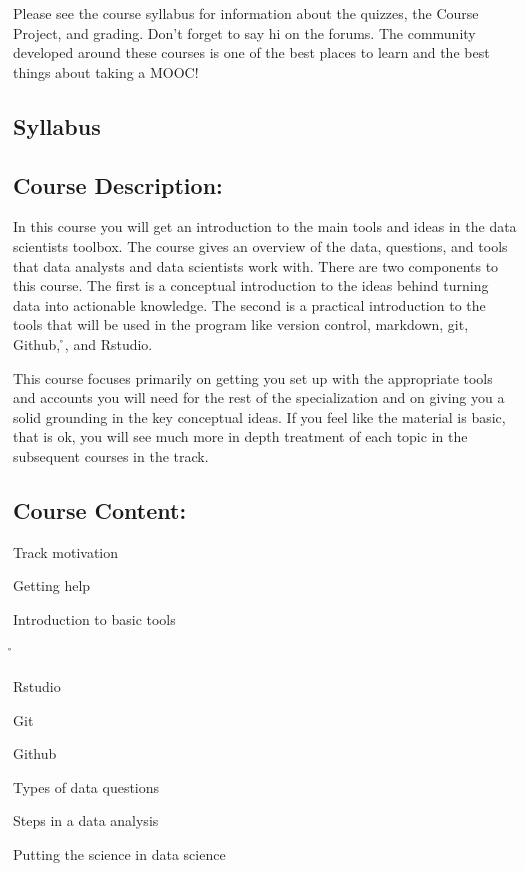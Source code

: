 Please see the course syllabus for information about the quizzes, the Course Project, and grading. Don't forget to say hi on the forums. The community developed around these courses is one of the best places to learn and the best things about taking a MOOC!


\subsection{Syllabus}

\subsection*{Course Description:}

In this course you will get an introduction to the main tools and ideas in the data scientists toolbox. The course gives an overview of the data, questions, and tools that data analysts and data scientists work with. There are two components to this course. The first is a conceptual introduction to the ideas behind turning data into actionable knowledge. The second is a practical introduction to the tools that will be used in the program like version control, markdown, git, Github, \r{}, and Rstudio.

This course focuses primarily on getting you set up with the appropriate tools and accounts you will need for the rest of the specialization and on giving you a solid grounding in the key conceptual ideas. If you feel like the material is basic, that is ok, you will see much more in depth treatment of each topic in the subsequent courses in the track.


\subsection*{Course Content:}

\begin{nitemize}
\item    Track motivation
\item    Getting help
\item    Introduction to basic tools
\item    \r{}
\item    Rstudio
\item    Git
\item    Github
\item    Types of data questions
\item    Steps in a data analysis
\item    Putting the science in data science
\end{nitemize}


